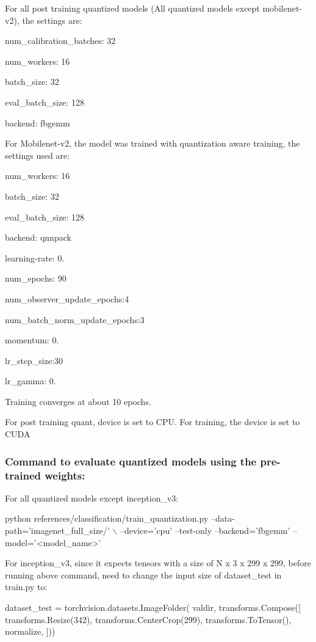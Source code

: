 For all post training quantized models (All quantized models except mobilenet-\/v2), the settings are\+:


\begin{DoxyEnumerate}
\item num\+\_\+calibration\+\_\+batches\+: 32
\item num\+\_\+workers\+: 16
\item batch\+\_\+size\+: 32
\item eval\+\_\+batch\+\_\+size\+: 128
\item backend\+: \textquotesingle{}fbgemm\textquotesingle{}
\end{DoxyEnumerate}

For Mobilenet-\/v2, the model was trained with quantization aware training, the settings used are\+:
\begin{DoxyEnumerate}
\item num\+\_\+workers\+: 16
\item batch\+\_\+size\+: 32
\item eval\+\_\+batch\+\_\+size\+: 128
\item backend\+: \textquotesingle{}qnnpack\textquotesingle{}
\item learning-\/rate\+: 0.
\item num\+\_\+epochs\+: 90
\item num\+\_\+observer\+\_\+update\+\_\+epochs\+:4
\item num\+\_\+batch\+\_\+norm\+\_\+update\+\_\+epochs\+:3
\item momentum\+: 0.
\item lr\+\_\+step\+\_\+size\+:30
\item lr\+\_\+gamma\+: 0.
\end{DoxyEnumerate}

Training converges at about 10 epochs.

For post training quant, device is set to C\+PU. For training, the device is set to C\+U\+DA

\subsubsection*{Command to evaluate quantized models using the pre-\/trained weights\+:}

For all quantized models except inception\+\_\+v3\+: 
\begin{DoxyCode}
python references/classification/train\_quantization.py  --data-path='imagenet\_full\_size/' \(\backslash\)
    --device='cpu' --test-only --backend='fbgemm' --model='<model\_name>'
\end{DoxyCode}


For inception\+\_\+v3, since it expects tensors with a size of N x 3 x 299 x 299, before running above command, need to change the input size of dataset\+\_\+test in train.\+py to\+: 
\begin{DoxyCode}
dataset\_test = torchvision.datasets.ImageFolder(
    valdir,
    transforms.Compose([
        transforms.Resize(342),
        transforms.CenterCrop(299),
        transforms.ToTensor(),
        normalize,
    ]))
\end{DoxyCode}
 